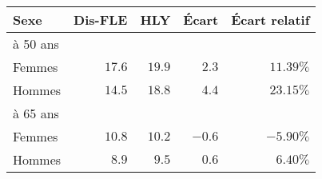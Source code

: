\begin{tabular}{lrrrr}
\toprule
Sexe & Dis-FLE & HLY & Écart & Écart relatif \\ 
\midrule
\multicolumn{5}{l}{à 50 ans} \\ 
\midrule
Femmes & $17.6$ & $19.9$ & $2.3$ & $11.39\%$ \\ 
Hommes & $14.5$ & $18.8$ & $4.4$ & $23.15\%$ \\ 
\midrule
\multicolumn{5}{l}{à 65 ans} \\ 
\midrule
Femmes & $10.8$ & $10.2$ & $-0.6$ & $-5.90\%$ \\ 
Hommes & $8.9$ & $9.5$ & $0.6$ & $6.40\%$ \\ 
\bottomrule
\end{tabular}

